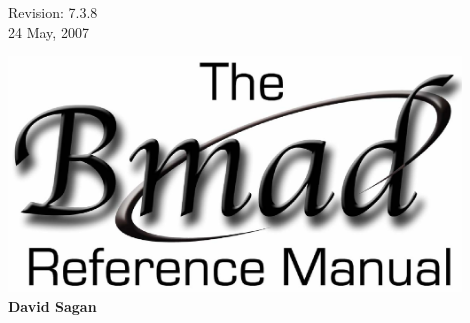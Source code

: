 \thispagestyle{empty}

\begin{flushright}
\large
  Revision: 7.3.8 \\
  24 May, 2007 \\
\end{flushright}

\vfill

{
\begin{center}
\includegraphics[width=12cm]{bmad-ref-manual.eps} \\
\vskip 0.3in
\huge\bf David Sagan
\end{center}
}

\vfill
\break

